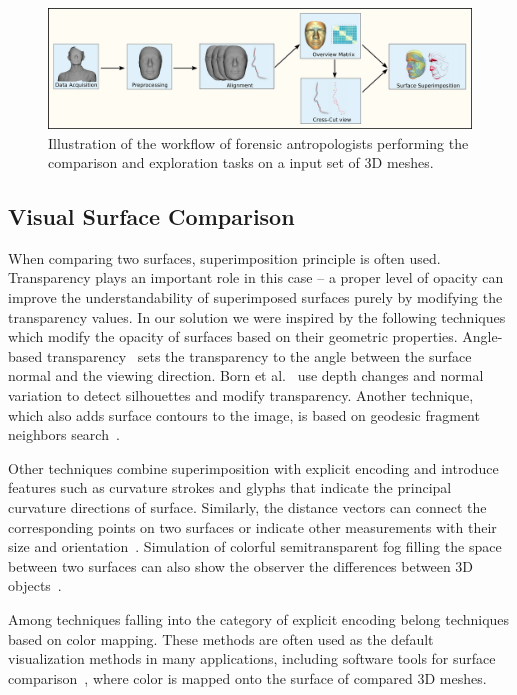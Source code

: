 \documentclass[final,5p,times]{elsarticle}
\begin{document}
\begin{figure}[tbh]
	\centering
  \includegraphics[width=1\linewidth]{pictures/pipeline1.png}
  \caption{\label{fig:pipeline} Illustration of the workflow of forensic antropologists performing the comparison and exploration tasks on a input set of 3D meshes.}
	\vspace{-2mm}
\end{figure}


\subsection{Visual Surface Comparison}
When comparing two surfaces, superimposition principle is often used.
Transparency plays an important role in this case -- a proper level of opacity can improve the understandability of superimposed surfaces purely by modifying the transparency values. 
In our solution we were inspired by the following techniques which modify the opacity of surfaces based on their geometric properties. 
Angle-based transparency~\cite{hummel2010iris} sets the transparency to the angle between the surface normal and the viewing direction. 
Born et al.~\cite{born2009illustrative} use depth changes and normal variation to detect silhouettes and modify transparency. 
Another technique, which also adds surface contours to the image, is based on geodesic fragment neighbors search~\cite{carnecky2013smart}. 

Other techniques \cite{interrante1997conveying,diewald2000anisotropic,weigle2005visualizing} combine superimposition with explicit encoding and introduce features such as curvature strokes and glyphs that indicate the principal curvature directions of surface.
Similarly, the distance vectors can connect the corresponding points on two surfaces or indicate other measurements with their size and orientation~\cite{busking2011image}. 
Simulation of colorful semitransparent fog filling the space between two surfaces can also show the observer the differences between 3D objects~\cite{busking2011image}.

Among techniques falling into the category of explicit encoding belong techniques based on color mapping. 
These methods are often used as the default visualization methods in many applications, including software tools for surface comparison~\cite{CCompare,ymca}, where color is mapped onto the surface of compared 3D meshes. 
\end{document}
